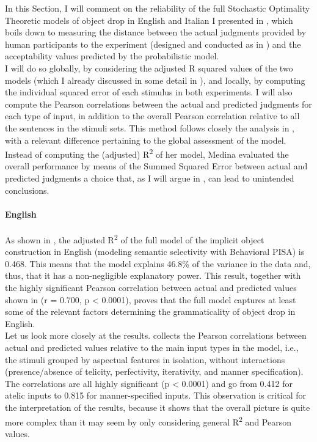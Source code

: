 In this Section, I will comment on the reliability of the full Stochastic Optimality Theoretic models of object drop in English and Italian I presented in , which boils down to measuring the distance between the actual judgments provided by human participants to the experiment (designed and conducted as in ) and the acceptability values predicted by the probabilistic model.\\
I will do so globally, by considering the adjusted R squared values of the two models (which I already discussed in some detail in ), and locally, by computing the individual squared error of each stimulus in both experiments. I will also compute the Pearson correlations between the actual and predicted judgments for each type of input, in addition to the overall Pearson correlation relative to all the sentences in the stimuli sets. This method follows closely the analysis in \textcite[146-154]{Medina2007}, with a relevant difference pertaining to the global assessment of the model. Instead of computing the (adjusted) R\textsuperscript{2} of her model, Medina evaluated the overall performance by means of the Summed Squared Error between actual and predicted judgments \textemdash a choice that, as I will argue in , can lead to unintended conclusions.


\paragraph{English} 
As shown in , the adjusted R\textsuperscript{2} of the full model of the implicit object construction in English (modeling semantic selectivity with Behavioral PISA) is 0.468. This means that the model explains 46.8\% of the variance in the data and, thus, that it has a non-negligible explanatory power. This result, together with the highly significant Pearson correlation between actual and predicted values shown in  (r = 0.700, p < 0.0001), proves that the full model captures at least some of the relevant factors determining the grammaticality of object drop in English.\\
Let us look more closely at the results.  collects the Pearson correlations between actual and predicted values relative to the main input types in the model, i.e., the stimuli grouped by aspectual features in isolation, without interactions (presence/absence of telicity, perfectivity, iterativity, and manner specification). The correlations are all highly significant (p < 0.0001) and go from 0.412 for atelic inputs to 0.815 for manner-specified inputs. This observation is critical for the interpretation of the results, because it shows that the overall picture is quite more complex than it may seem by only considering general R\textsuperscript{2} and Pearson values.

